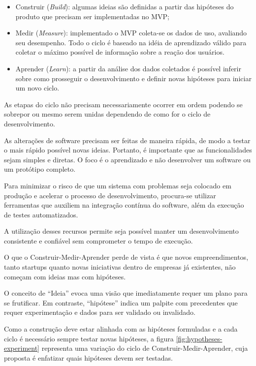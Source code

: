 \begin{itemize}
\item Construir (\emph{Build}): algumas ideias são definidas a partir das hipóteses do produto que precisam ser implementadas no MVP;
\item Medir (\emph{Measure}): implementado o MVP coleta-se os dados de uso, avaliando seu desempenho. Todo o ciclo é baseado na idéia de aprendizado válido para coletar o máximo possível de informação sobre a reação dos usuários.
\item Aprender (\emph{Learn}): a partir da análise dos dados coletados é possível inferir sobre como prosseguir o desenvolvimento e definir novas hipóteses para iniciar um novo ciclo.
\end{itemize}
\par As etapas do ciclo não precisam necessariamente ocorrer em ordem podendo se sobrepor ou mesmo serem unidas dependendo de como for o ciclo de desenvolvimento. \citep{ries:11}
\par As alterações de software precisam ser feitas de maneira rápida, de modo a testar o mais rápido possível novas ideias. Portanto, é importante que as funcionalidades sejam simples e
 diretas. O foco é o aprendizado e não desenvolver um software ou um protótipo completo.
\par Para minimizar o risco de que um sistema com problemas seja colocado em produção e acelerar o processo de desenvolvimento, procura-se utilizar ferramentas que auxiliem na integração contínua do software, além da execução de testes automatizados.
\par A utilização desses recursos permite seja possível manter um desenvolvimento consistente e confiável sem comprometer o tempo de execução.
\par O que o Construir-Medir-Aprender perde de vista é que novos empreendimentos, tanto startups quanto novas iniciativas dentro de empresas já existentes, não começam com ideias mas com hipóteses.
\par O conceito de ``Ideia'' evoca uma visão que imediatamente requer um plano para se frutificar. Em contraste, ``hipótese'' indica um palpite com precedentes que requer experimentação e dados para ser validado ou invalidado. \citep{blankendeavor}
\par Como a construção deve estar alinhada com as hipóteses formuladas e a cada ciclo é necessário sempre testar novas hipóteses, a figura \ref{fig:hypotheses-experiment} representa uma variação do ciclo de Construir-Medir-Aprender, cuja proposta é enfatizar quais hipóteses devem ser testadas.
